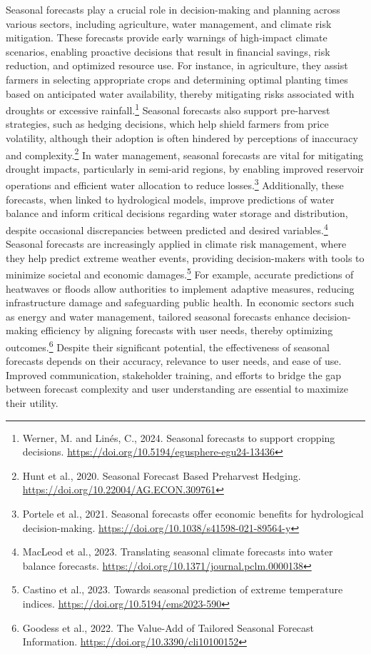 Seasonal forecasts play a crucial role in decision-making and planning across various sectors, including agriculture, water management, and climate risk mitigation. These forecasts provide early warnings of high-impact climate scenarios, enabling proactive decisions that result in financial savings, risk reduction, and optimized resource use. For instance, in agriculture, they assist farmers in selecting appropriate crops and determining optimal planting times based on anticipated water availability, thereby mitigating risks associated with droughts or excessive rainfall.\footnote{Werner, M. and Linés, C., 2024. Seasonal forecasts to support cropping decisions. \url{https://doi.org/10.5194/egusphere-egu24-13436}} Seasonal forecasts also support pre-harvest strategies, such as hedging decisions, which help shield farmers from price volatility, although their adoption is often hindered by perceptions of inaccuracy and complexity.\footnote{Hunt et al., 2020. Seasonal Forecast Based Preharvest Hedging. \url{https://doi.org/10.22004/AG.ECON.309761}} In water management, seasonal forecasts are vital for mitigating drought impacts, particularly in semi-arid regions, by enabling improved reservoir operations and efficient water allocation to reduce losses.\footnote{Portele et al., 2021. Seasonal forecasts offer economic benefits for hydrological decision-making. \url{https://doi.org/10.1038/s41598-021-89564-y}} Additionally, these forecasts, when linked to hydrological models, improve predictions of water balance and inform critical decisions regarding water storage and distribution, despite occasional discrepancies between predicted and desired variables.\footnote{MacLeod et al., 2023. Translating seasonal climate forecasts into water balance forecasts. \url{https://doi.org/10.1371/journal.pclm.0000138}} Seasonal forecasts are increasingly applied in climate risk management, where they help predict extreme weather events, providing decision-makers with tools to minimize societal and economic damages.\footnote{Castino et al., 2023. Towards seasonal prediction of extreme temperature indices. \url{https://doi.org/10.5194/ems2023-590}} For example, accurate predictions of heatwaves or floods allow authorities to implement adaptive measures, reducing infrastructure damage and safeguarding public health. In economic sectors such as energy and water management, tailored seasonal forecasts enhance decision-making efficiency by aligning forecasts with user needs, thereby optimizing outcomes.\footnote{Goodess et al., 2022. The Value-Add of Tailored Seasonal Forecast Information. \url{https://doi.org/10.3390/cli10100152}} Despite their significant potential, the effectiveness of seasonal forecasts depends on their accuracy, relevance to user needs, and ease of use. Improved communication, stakeholder training, and efforts to bridge the gap between forecast complexity and user understanding are essential to maximize their utility.



